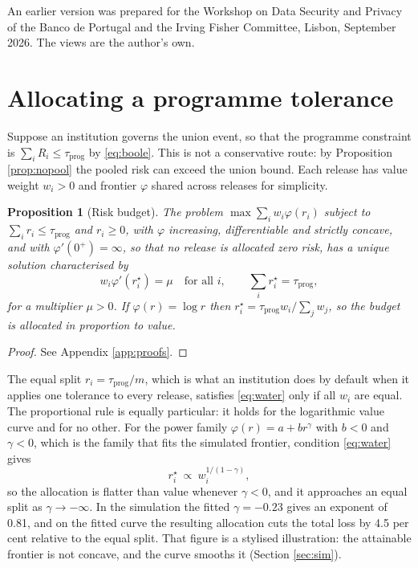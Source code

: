 \documentclass[11pt,a4paper]{article}
\theoremstyle{plain}
\newtheorem{proposition}{Proposition}
\theoremstyle{definition}
\theoremstyle{definition}
\theoremstyle{plain}
\begin{document}
An earlier version was prepared for the Workshop on Data Security and Privacy of
the Banco de Portugal and the Irving Fisher Committee, Lisbon, September 2026.
The views are the author's own.

\appendix
{}

\section{Allocating a programme tolerance}\label{app:budget}

Suppose an institution governs the union event, so that the programme
constraint is $\sum_i R_i \leq \tau_{\mathrm{prog}}$ by \eqref{eq:boole}. This is
not a conservative route: by Proposition \ref{prop:nopool} the pooled risk can
exceed the union bound. Each release has value weight $w_i > 0$ and frontier
$\varphi$ shared across releases for simplicity.

\begin{proposition}[Risk budget]\label{prop:budget}
The problem $\max \sum_i w_i \varphi(r_i)$ subject to $\sum_i r_i \leq
\tau_{\mathrm{prog}}$ and $r_i \geq 0$, with $\varphi$ increasing,
differentiable and strictly concave, and with $\varphi'(0^+) = \infty$, so that no release is
allocated zero risk, has a unique solution characterised by
\begin{equation}
w_i \varphi'(r_i^\star) = \mu \quad \text{for all } i, \qquad
\sum_i r_i^\star = \tau_{\mathrm{prog}} ,
\label{eq:water}
\end{equation}
for a multiplier $\mu > 0$. If $\varphi(r) = \log r$ then $r_i^\star =
\tau_{\mathrm{prog}} w_i / \sum_j w_j$, so the budget is allocated in
proportion to value.
\end{proposition}

\begin{proof}
See Appendix \ref{app:proofs}.
\end{proof}

The equal split $r_i = \tau_{\mathrm{prog}}/m$, which is what an institution
does by default when it applies one tolerance to every release, satisfies
\eqref{eq:water} only if all $w_i$ are equal. The proportional rule is equally
particular: it holds for the logarithmic value curve and for no other. For the
power family $\varphi(r) = a + b r^{\gamma}$ with $b < 0$ and $\gamma < 0$,
which is the family that fits the simulated frontier, condition
\eqref{eq:water} gives
\begin{equation}
r_i^\star \ \propto \ w_i^{1/(1-\gamma)} ,
\label{eq:power}
\end{equation}
so the allocation is flatter than value whenever $\gamma < 0$, and it
approaches an equal split as $\gamma \to -\infty$. In the simulation the fitted $\gamma = -0.23$ gives an exponent of 0.81, and
on the fitted curve the resulting allocation cuts the total loss by 4.5 per cent
relative to the equal split. That figure is a stylised illustration: the
attainable frontier is not concave, and the curve smooths it (Section
\ref{sec:sim}).
\end{document}

